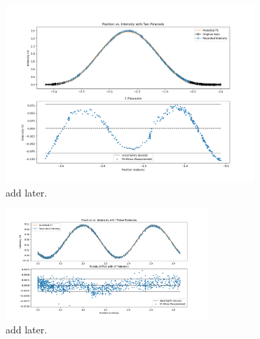 \documentclass[11pt]{article}
\begin{document}
\begin{multicols}{2}
    \begin{figure}[H]
        \hspace{-25pt} 
        \includegraphics[width=3.7in]{malus_2.png}
        \caption{add later.}
        \label{fig:malus_2}
    \end{figure}

\vspace{-20pt}

    \begin{figure}[H]
        \hspace{-5pt}
        \includegraphics[width=3in]{malus_3.png}
        \caption{add later.}
        \label{fig:malus_3}
    \end{figure}





\end{multicols}
\end{document}
